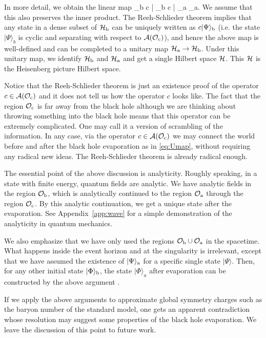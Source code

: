 \documentclass[12pt,a4paper]{article}
\theoremstyle{plain}
\theoremstyle{definition}
\numberwithin{thm}{section}
\newcommand{\ket}[1]{ | {#1} \rangle }
\def\CA{{\cal A}}
\def\CH{{\cal H}}
\def\CO{{\cal O}}
\def\beq#1\eeq{\begin{align}#1\end{align}}
\begin{document}
In more detail, we obtain the linear map
\beq
\CH_{\rm b} \ni c\ket{\Psi}_{\rm b} \mapsto c\ket{\Psi}_{\rm a} \in \CH_{\rm a}. \label{eq:Umap}
\eeq
We assume that this also preserves the inner product. The Reeh-Schlieder theorem implies that any state in a dense subset of $\CH_{\rm b}$ can be uniquely written as $c\ket{\Psi}_{\rm b}$ (i.e.
the state $\ket{\Psi}_b$ is cyclic and separating with respect to $\CA(\CO_{\rm c})$), and hence the above map is well-defined and can be completed to a unitary map $\CH_{\rm a} \to \CH_{\rm b}$.
Under this unitary map, we identify $\CH_{\rm b}$ and $\CH_{\rm a}$ and get a single Hilbert space $\CH$. This $\CH$ is the Heisenberg picture Hilbert space.


Notice that the Reeh-Schlieder theorem is just an existence proof of the operator $c \in \CA(\CO_{\rm c})$ and it does not tell us how the operator $c$ looks like.
The fact that the region $\CO_{\rm c}$ is far away from the black hole although we are thinking about throwing something into the black hole
means that this operator can be extremely complicated. 
One may call it a version of scrambling of the information.  In any case, via the operator $c \in \CA(\CO_{\rm c})$
we may connect the world before and after the black hole evaporation as in \eqref{eq:Umap}, without requiring any radical new ideas.
The Reeh-Schlieder theorem is already radical enough.


The essential point of the above discussion is analyticity. Roughly speaking,
in a state with finite energy, quantum fields are analytic.
We have analytic fields in the region $\CO_{\rm b}$, which is analytically continued to the region $\CO_{\rm a}$ through the region $\CO_{\rm c}$.
By this analytic continuation, we get a unique state after the evaporation.
See Appendix~\ref{app:wave} for a simple demonstration of the analyticity in quantum mechanics.

We also emphasize that we have only used the regions $\CO_{\rm b} \cup \CO_{\rm a}$ in the spacetime.
What happens inside the event horizon and at the singularity is irrelevant, except that 
we have assumed the existence of $\ket{\Psi}_{\rm a}$ for a specific single state $\ket{\Psi}$.
Then, for any other initial state $\ket{\Phi}_{\rm b}$, the state $\ket{\Phi}_a$ after evaporation can be constructed by the above argument .



If we apply the above arguments to approximate global symmetry charges such as the baryon number of the standard model,
one gets an apparent contradiction whose resolution may suggest some properties of the black hole evaporation.
We leave the discussion of this point to future work.
\end{document}
